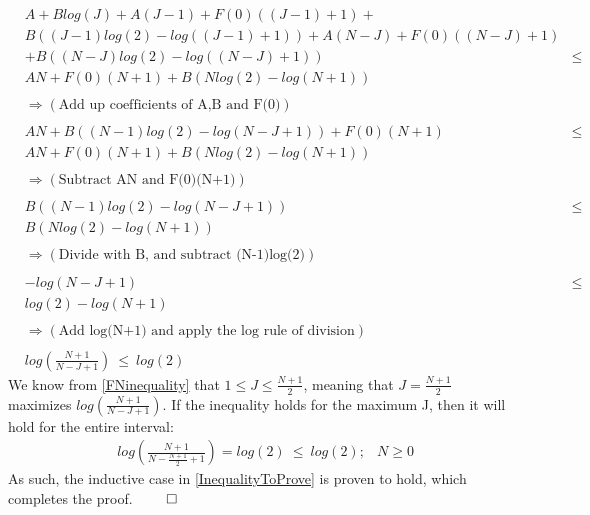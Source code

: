 \begin{equation*}	
\begin{aligned}
&A + Blog(J) + A(J-1) + F(0)((J-1)+1) +                  & \\
&B((J-1)log(2)-log((J-1)+1)) + A(N-J) + F(0)((N-J)+1)    & \\
& + B((N-J)log(2)-log((N-J)+1))                          &\le  \\
&AN + F(0)(N+1) + B(Nlog(2)-log(N+1))                    & \\
& & \\
&\Rightarrow (\text{Add up coefficients of A,B and F(0)})& \\
& & \\
&AN + B((N-1)log(2)-log(N-J+1)) + F(0)(N+1)              &\le \\
&AN + F(0)(N+1) + B(Nlog(2)-log(N+1))                    &  \\	
& & \\
&\Rightarrow (\text{Subtract AN and F(0)(N+1)})          & \\
& & \\	
&B((N-1)log(2)-log(N-J+1))                               &\le \\
&B(Nlog(2)-log(N+1))                                     &  \\	
& & \\
&\Rightarrow (\text{Divide with B, and subtract (N-1)log(2)})      & \\
& & \\
&-log(N-J+1)                                             &\le \\
&log(2)-log(N+1)                                         &  \\	
& & \\
&\Rightarrow (\text{Add log(N+1) and apply the log rule of division})    & \\
& & \\			
&log(\frac{N+1}{N-J+1}) \  \le \  log(2)                 & 	
\end{aligned}
\end{equation*}
We know from \ref{FNinequality} that $1 \le J \le \frac{N+1}{2}$, meaning that $J=\frac{N+1}{2}$ maximizes $log(\frac{N+1}{N-J+1})$. If the inequality holds for the maximum J, then it will hold for the entire interval: 
\begin{equation*}	
\begin{aligned}	
&log(\frac{N+1}{N-\frac{N+1}{2}+1}) = log(2) \  \le \  log(2);  & N \ge 0 	
\end{aligned}
\end{equation*}
As such, the inductive case in \ref{InequalityToProve} is proven to hold, which completes the proof. $\qed$

